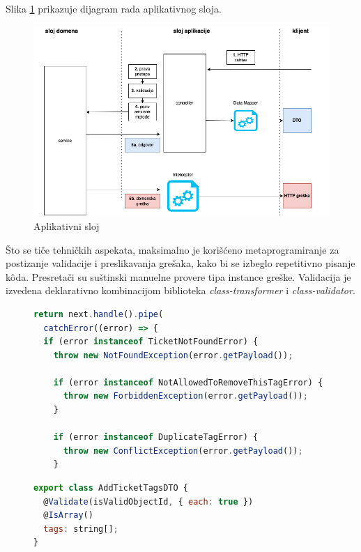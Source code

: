 \documentclass[12pt,oneside]{memoir}
\begin{document}
Slika \ref{fig:applayerdiagram} prikazuje dijagram rada aplikativnog sloja.

\begin{figure}[h]
  \centering
  \includegraphics[width=1\textwidth]{docs/images/ch_2/applayer.png} 
  \caption{Aplikativni sloj}
  \label{fig:applayerdiagram}
\end{figure}

Što se tiče tehničkih aspekata, maksimalno je korišćeno metaprogramiranje za postizanje validacije i preslikavanja grešaka, kako bi se izbeglo repetitivno pisanje k\^{o}da. Presretači su suštinski manuelne provere tipa instance greške. Validacija je izvedena deklarativno kombinacijom biblioteka \textit{class-transformer} i \textit{class-validator}.

\begin{figure}[h]
\begin{lstlisting}[language=JavaScript, style=ES6, caption={Presretač grešaka.}]
return next.handle().pipe(
  catchError((error) => {
  if (error instanceof TicketNotFoundError) {
    throw new NotFoundException(error.getPayload());

    if (error instanceof NotAllowedToRemoveThisTagError) {
      throw new ForbiddenException(error.getPayload());
    }

    if (error instanceof DuplicateTagError) {
      throw new ConflictException(error.getPayload());
    }
\end{lstlisting}
\end{figure}




\begin{figure}[h]
\begin{lstlisting}[language=JavaScript, style=ES6, caption={Validacija ulaznog DTO-a.}]
export class AddTicketTagsDTO {
  @Validate(isValidObjectId, { each: true })
  @IsArray()
  tags: string[];
}
\end{lstlisting}
\end{figure}
\end{document}
